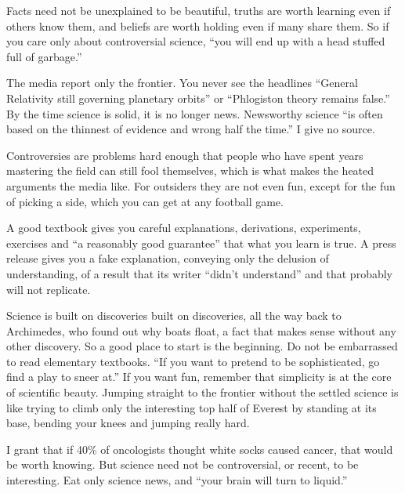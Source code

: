 
Facts need not be unexplained to be beautiful, truths are worth learning even if others know them, and beliefs are worth holding even if many share them. So if you care only about controversial science, ``you will end up with a head stuffed full of garbage.''

The media report only the frontier. You never see the headlines ``General Relativity still governing planetary orbits'' or ``Phlogiston theory remains false.'' By the time science is solid, it is no longer news. Newsworthy science ``is often based on the thinnest of evidence and wrong half the time.'' I give no source. 

Controversies are problems hard enough that people who have spent years mastering the field can still fool themselves, which is what makes the heated arguments the media like. For outsiders they are not even fun, except for the fun of picking a side, which you can get at any football game.

A good textbook gives you careful explanations, derivations, experiments, exercises and ``a reasonably good guarantee'' that what you learn is true. A press release gives you a fake explanation, conveying only the delusion of understanding, of a result that its writer ``didn't understand'' and that probably will not replicate. 

Science is built on discoveries built on discoveries, all the way back to Archimedes, who found out why boats float, a fact that makes sense without any other discovery. So a good place to start is the beginning. Do not be embarrassed to read elementary textbooks. ``If you want to pretend to be sophisticated, go find a play to sneer at.'' If you want fun, remember that simplicity is at the core of scientific beauty. Jumping straight to the frontier without the settled science is like trying to climb only the interesting top half of Everest by standing at its base, bending your knees and jumping really hard.

I grant that if 40\% of oncologists thought white socks caused cancer, that would be worth knowing. But science need not be controversial, or recent, to be interesting. Eat only science news, and ``your brain will turn to liquid.''

